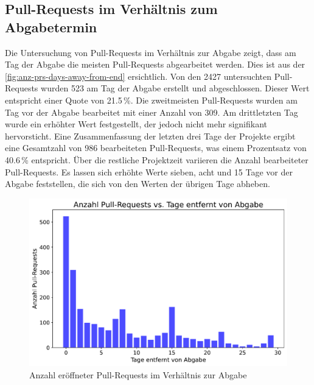 \subsection{Pull-Requests im Verhältnis zum Abgabetermin}
Die Untersuchung von Pull-Requests im Verhältnis zur Abgabe zeigt, dass am Tag der Abgabe die meisten Pull-Requests abgearbeitet werden. Dies ist aus der \autoref{fig:anz-prs-days-away-from-end} ersichtlich. Von den 2427 untersuchten Pull-Requests wurden 523 am Tag der Abgabe erstellt und abgeschlossen. Dieser Wert entspricht einer Quote von 21.5\,\%.  Die zweitmeisten Pull-Requests wurden am Tag vor der Abgabe bearbeitet mit einer Anzahl von 309. Am drittletzten Tag wurde ein erhöhter Wert festgestellt, der jedoch nicht mehr signifikant hervorsticht. Eine Zusammenfassung der letzten drei Tage der Projekte ergibt eine Gesamtzahl von 986 bearbeiteten Pull-Requests, was einem Prozentsatz von 40.6\,\% entspricht. Über die restliche Projektzeit variieren die Anzahl bearbeiteter Pull-Requests. Es lassen sich erhöhte Werte sieben, acht und 15 Tage vor der Abgabe feststellen, die sich von den Werten der übrigen Tage abheben.
\begin{figure}[htbp]
    \includegraphics[width=\textwidth]{Figures/anz-prs-days-away-from-end.pdf}
    \caption{Anzahl eröffneter Pull-Requests im Verhältnis zur Abgabe}
    \label{fig:anz-prs-days-away-from-end}
\end{figure}

